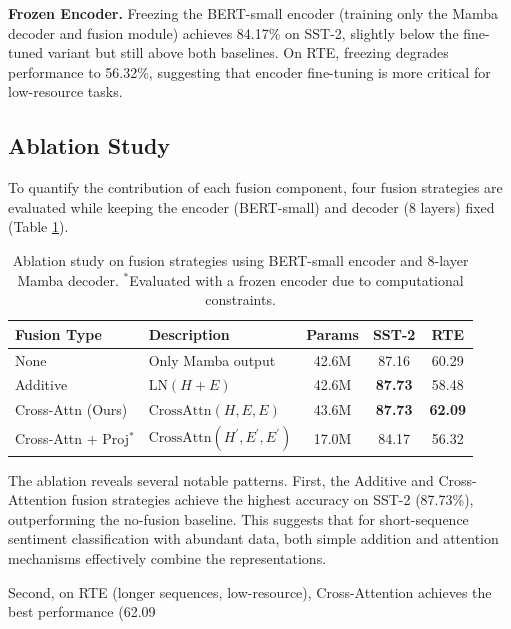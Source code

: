 \documentclass[runningheads]{llncs}
\begin{document}
\noindent \textbf{Frozen Encoder.} Freezing the BERT-small encoder (training only the Mamba decoder and fusion module) achieves 84.17\% on SST-2, slightly below the fine-tuned variant but still above both baselines. On RTE, freezing degrades performance to 56.32\%, suggesting that encoder fine-tuning is more critical for low-resource tasks.

\subsection{Ablation Study}
To quantify the contribution of each fusion component, four fusion strategies are evaluated while keeping the encoder (BERT-small) and decoder (8 layers) fixed (Table \ref{tab:ablation}).

\begin{table}[h]
\centering
\caption{Ablation study on fusion strategies using BERT-small encoder and 8-layer Mamba decoder. $^{*}$Evaluated with a frozen encoder due to computational constraints.}
\label{tab:ablation}
\begin{tabular}{llccc}
\toprule
\textbf{Fusion Type} & \textbf{Description} & \textbf{Params} & \textbf{SST-2} & \textbf{RTE} \\
\midrule
None & Only Mamba output & 42.6M & 87.16 & 60.29 \\
Additive & $\text{LN}(H+E)$ & 42.6M & \textbf{87.73} & 58.48 \\
Cross-Attn (Ours) & $\text{CrossAttn}(H,E,E)$ & 43.6M & \textbf{87.73} & \textbf{62.09} \\
Cross-Attn + Proj$^{*}$ & $\text{CrossAttn}(H^{\prime}, E^{\prime}, E^{\prime})$ & 17.0M & 84.17 & 56.32 \\
\bottomrule
\end{tabular}
\end{table}

The ablation reveals several notable patterns. First, the Additive and Cross-Attention fusion strategies achieve the highest accuracy on SST-2 (87.73\%), outperforming the no-fusion baseline. This suggests that for short-sequence sentiment classification with abundant data, both simple addition and attention mechanisms effectively combine the representations.

Second, on RTE (longer sequences, low-resource), Cross-Attention achieves the best performance (62.09%
\end{document}

